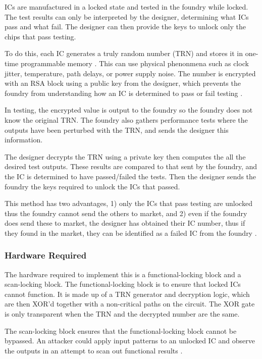 \documentclass{IEEEtran}
\begin{document}
ICs are manufactured in a locked state and tested in the foundry while  locked. The test results can only be interpreted by the designer, determining what ICs pass and what fail. The designer can then provide the keys to unlock only the chips that pass testing. 

To do this, each IC generates a truly random number (TRN) and stores it in one-time programmable memory \cite{CSST}. This can use physical phenonmena such as clock jitter, temperature, path delays, or power supply noise. The number is encrypted with an RSA block using a public key from the designer, which prevents the foundry from understanding how an IC is determined to pass or fail testing \cite{SST}. 

In testing, the encrypted value is output to the foundry so the foundry does not know the original TRN. The foundry also gathers performance tests where the outputs have been perturbed with the TRN, and sends the designer this information.

The designer decrypts the TRN using a private key then computes the all the desired test outputs. These results are compared to that sent by the foundry, and the IC is determined to have passed/failed the tests. Then the designer sends the foundry the keys required to unlock the ICs that passed. 

This method has two advantages, 1) only the ICs that pass testing are unlocked thus the foundry cannot send the others to market, and 2) even if the foundry does send these to market, the designer has obtained their IC number, thus if they found in the market, they can be identified as a failed IC from the foundry \cite{CSST}.

\subsubsection{Hardware Required}

The hardware required to implement this is a functional-locking block and a scan-locking block. The functional-locking block is to ensure that locked ICs cannot function. It is made up of a TRN generator and decryption logic, which are then XOR'd together with a non-critical paths on the circuit. The XOR gate is only transparent when the TRN and the decrypted number are the same. 

The scan-locking block ensures that the functional-locking block cannot be bypassed. An attacker could apply input patterns to an unlocked IC and observe the outputs in an attempt to scan out functional results  \cite{SST}.
\end{document}
